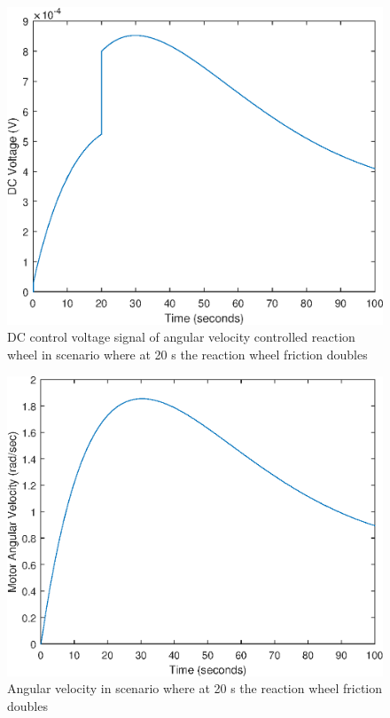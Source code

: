\begin{figure}
	\centering
	\includegraphics[width=120mm]{figures/voltage_Noreconfig}
	\caption{DC control voltage signal of angular velocity controlled reaction wheel in scenario where at 20 s the reaction wheel friction doubles}
	\label{fig:rwFaultRes}
\end{figure} 

\begin{figure}
	\centering
	\includegraphics[width=120mm]{figures/omega_Noreconfig}
	\caption{Angular velocity in scenario where at 20 s the reaction wheel friction doubles}
	\label{fig:rwFaultRes}
\end{figure} 



